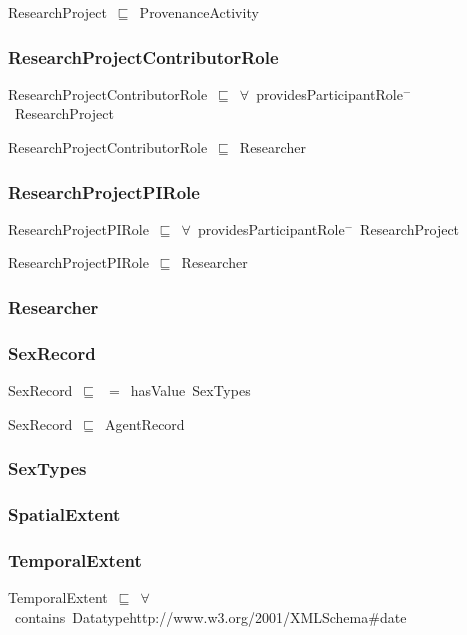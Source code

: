 \documentclass{article}
\begin{document}
ResearchProject~\ensuremath{\sqsubseteq}~ProvenanceActivity~

\subsubsection*{ResearchProjectContributorRole}

ResearchProjectContributorRole~\ensuremath{\sqsubseteq}~\ensuremath{\forall}~providesParticipantRole\ensuremath{^-}~ResearchProject~

ResearchProjectContributorRole~\ensuremath{\sqsubseteq}~Researcher~

\subsubsection*{ResearchProjectPIRole}

ResearchProjectPIRole~\ensuremath{\sqsubseteq}~\ensuremath{\forall}~providesParticipantRole\ensuremath{^-}~ResearchProject~

ResearchProjectPIRole~\ensuremath{\sqsubseteq}~Researcher~

\subsubsection*{Researcher}

\subsubsection*{SexRecord}

SexRecord~\ensuremath{\sqsubseteq}~\ensuremath{=}~hasValue~SexTypes~

SexRecord~\ensuremath{\sqsubseteq}~AgentRecord~

\subsubsection*{SexTypes}

\subsubsection*{SpatialExtent}

\subsubsection*{TemporalExtent}

TemporalExtent~\ensuremath{\sqsubseteq}~\ensuremath{\forall}~contains~Datatypehttp://www.w3.org/2001/XMLSchema#date~
\end{document}
